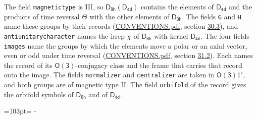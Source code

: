 \documentclass[10pt,a4paper]{article}
\newcommand{\needspace}[1]{\par\penalty-100\begingroup\dimen0=#1\relax\dimen2=\pagegoal
  \advance\dimen2-\pagetotal\ifdim\dimen0>\dimen2\relax\ifdim\dimen2>0pt\vfil\break\fi\fi
  \endgroup}
\numberwithin{equation}{section}
\newcommand{\grp}[1]{\mathsf{#1}}
\begin{document}
The field \texttt{magnetictype} is III, so $\grp{D_{8h}}(\grp{D_{4d}})$ contains the elements of $\grp{D_{4d}}$ and the products of time reversal $\varTheta$ with the other elements of $\grp{D_{8h}}$. The fields \texttt{G} and \texttt{H} name these groups by their records (\href{../../CONVENTIONS.pdf}{CONVENTIONS.pdf}, section \href{../../CONVENTIONS.pdf\#conv.30.3}{30.3}), and \texttt{antiunitarycharacter} names the irrep $\chi$ of $\grp{D_{8h}}$ with kernel $\grp{D_{4d}}$. The four fields \texttt{images} name the groups by which the elements move a polar or an axial vector, even or odd under time reversal (\href{../../CONVENTIONS.pdf}{CONVENTIONS.pdf}, section \href{../../CONVENTIONS.pdf\#conv.31.2}{31.2}). Each names the record of its $\grp{O(3)}$-conjugacy class and the frame that carries that record onto the image. The fields \texttt{normalizer} and \texttt{centralizer} are taken in $\grp{O(3)1'}$, and both groups are of magnetic type II. The field \texttt{orbifold} of the record gives the orbifold symbols of $\grp{D_{8h}}$ and of $\grp{D_{4d}}$.
\needspace{103pt}
\end{document}
